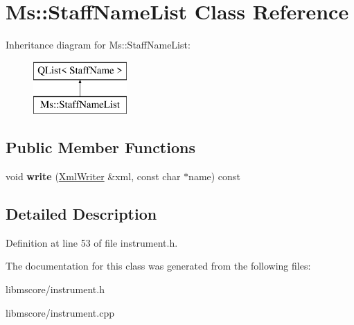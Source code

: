 \hypertarget{class_ms_1_1_staff_name_list}{}\section{Ms\+:\+:Staff\+Name\+List Class Reference}
\label{class_ms_1_1_staff_name_list}
Inheritance diagram for Ms\+:\+:Staff\+Name\+List\+:\begin{figure}[H]
\begin{center}
\leavevmode
\includegraphics[height=2.000000cm]{class_ms_1_1_staff_name_list}
\end{center}
\end{figure}
\subsection*{Public Member Functions}
\begin{DoxyCompactItemize}
\item 
\mbox{\label{class_ms_1_1_staff_name_list_a469a44ef12afe165f80c97ac194150ac}} 
void {\bfseries write} (\hyperlink{class_ms_1_1_xml_writer}{Xml\+Writer} \&xml, const char $\ast$name) const
\end{DoxyCompactItemize}


\subsection{Detailed Description}


Definition at line 53 of file instrument.\+h.



The documentation for this class was generated from the following files\+:\begin{DoxyCompactItemize}
\item 
libmscore/instrument.\+h\item 
libmscore/instrument.\+cpp\end{DoxyCompactItemize}
